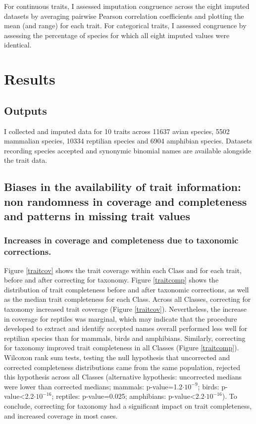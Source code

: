For continuous traits, I assessed imputation congruence across the eight imputed datasets by averaging pairwise Pearson correlation coefficients and plotting the mean (and range) for each trait. For categorical traits, I assessed congruence by assessing the percentage of species for which all eight imputed values were identical.

\section{Results}

\subsection{Outputs}
I collected and imputed data for 10 traits across 11637 avian species, 5502 mammalian species, 10334 reptilian species and 6904 amphibian species. Datasets recording species accepted and synonymic binomial names are available alongside the trait data. 

\subsection{Biases in the availability of trait information: non randomness in coverage and completeness and patterns in missing trait values}

\subsubsection{Increases in coverage and completeness due to taxonomic corrections.} 
Figure \ref{traitcov} shows the trait coverage within each Class and for each trait, before and after correcting for taxonomy. Figure \ref{traitcomp} shows the distribution of trait completeness before and after taxonomic corrections, as well as the median trait completeness for each Class.
Across all Classes, correcting for taxonomy increased trait coverage (Figure \ref{traitcov}). Nevertheless, the increase in coverage for reptiles was marginal, which may indicate that the procedure developed to extract and identify accepted names overall performed less well for reptilian species than for mammals, birds and amphibians. Similarly, correcting for taxonomy improved trait completeness in all Classes (Figure \ref{traitcomp}). Wilcoxon rank sum tests, testing the null hypothesis that uncorrected and corrected completeness distributions came from the same population, rejected this hypothesis across all Classes (alternative hypothesis: uncorrected medians were lower than corrected medians; mammals: p-value=1.2$\cdot10^{-9}$; birds: p-value<2.2$\cdot10^{-16}$; reptiles: p-value=0.025; amphibians: p-value<2.2$\cdot10^{-16}$). To conclude, correcting for taxonomy had a significant impact on trait completeness, and increased coverage in most cases. 

